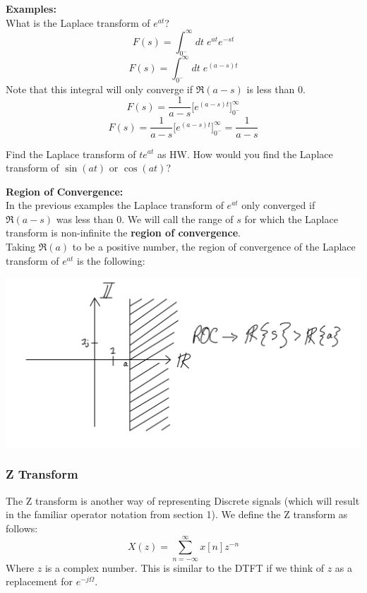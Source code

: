 \documentclass[a4paper]{article}
\numberwithin{equation}{section}
\begin{document}
\textbf{Examples:}\\
What is the Laplace transform of $e^{at}$? 
\begin{equation}
F(s)=\int_{0^-}^{\infty}dt\; e^{at}e^{-st}
\end{equation}
\begin{equation}
F(s)=\int_{0^-}^{\infty}dt\; e^{(a-s)t}
\end{equation}
Note that this integral will only converge if $\Re(a-s)$ is less than 0.
\begin{equation}
F(s)=\frac{1}{a-s}\big[ e^{(a-s)t} \big]_{0^-}^{\infty}
\end{equation}
\begin{equation}
F(s)=\frac{1}{a-s}\big[ e^{(a-s)t} \big]_{0^-}^{\infty} = \frac{1}{a-s}
\end{equation}

Find the Laplace transform of $t e^{at}$ as HW. How would you find the Laplace transform of $\sin{(at)}$ or $\cos{(at)}$?

\textbf{Region of Convergence:}\\
In the previous examples the Laplace transform of $e^{at}$ only converged if $\Re(a-s)$ was less than 0. We will call the range of $s$ for which the Laplace transform is non-infinite the \textbf{region of convergence}.\\

Taking $\Re(a)$ to be a positive number, the region of convergence of the Laplace transform of $e^{at}$ is the following:

\begin{center}
\includegraphics[scale=0.65]{S_convergence.png}
\end{center}

\subsubsection{Z Transform}
The Z transform is another way of representing Discrete signals (which will result in the familiar operator notation from section 1). We define the Z transform as follows:
\begin{equation}\boxed{
X(z)=\sum_{n=-\infty}^{\infty} x[n]z^{-n}}
\end{equation}
Where $z$ is a complex number. This is similar to the DTFT if we think of $z$ as a replacement for $e^{-j\Omega}$. \\
\end{document}
